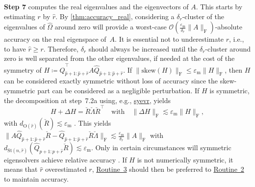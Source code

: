 \documentclass[10pt,twoside,dvipsnames]{siamart1116}
\numberwithin{algorithm}{section}
\numberwithin{equation}{section}
\newcommand{\wordref}[2]{\hyperlink{#1}{#2}}
\begin{document}
	\textbf{Step 7} computes the real eigenvalues and the eigenvectors of $A$. This starts by estimating $r$ by $\widehat{r}$.  By \cref{thm:accuracy_real}, considering a $\delta_r$-cluster of the eigenvalues of $\widehat{\Omega}$ around zero will provide a worst-case $\mathcal{O}(\frac{\varepsilon_\mathrm{m}}{\delta_r}\|A\|_\mathrm{F})$-absolute accuracy on the real eigenspace of~$A$. It is essential not to underestimate $r$, i.e., to have $\widehat{r}\geq r$. Therefore, $\delta_r$ should always be increased until the $\delta_r$-cluster around zero is well separated from the other eigenvalues, if needed at the cost of the symmetry of $H\coloneq \widehat{Q}_{\widehat{p}+1:\widehat{p}+\widehat{r}}^\top A\widehat{Q}_{\widehat{p}+1:\widehat{p}+\widehat{r}}$. If $\|\mathrm{skew}(H)\|_\mathrm{F}\leq \varepsilon_\mathrm{m} \|H\|_\mathrm{F}$, then $H$ can be considered exactly symmetric without loss of accuracy since the skew-symmetric part can be considered as a negligible perturbation. If $H$ is symmetric, the decomposition at step~7.2a using, e.g.,  \href{https://www.netlib.org/lapack/explore-html/d1/d56/group__heevr_gaa334ac0c11113576db0fc37b7565e8b5.html#gaa334ac0c11113576db0fc37b7565e8b5}{syevr}, yields
	\begin{equation*}
		 H + \Delta H = \breve{R}\breve{\Lambda}\breve{R}^\top\quad\text{with}\quad \|\Delta H\|_\mathrm{F}\lesssim \varepsilon_\mathrm{m}\|H\|_\mathrm{F},
	\end{equation*}
	  with $d_{\mathrm{O}(\widehat{r})}(\breve{R})\lesssim \varepsilon_\mathrm{m}$ \cite{lapack99}. This yields $\|A\widehat{Q}_{\widehat{p}+1:\widehat{p}+\widehat{r}} \breve{R} - \widehat{Q}_{\widehat{p}+1:\widehat{p}+\widehat{r}} \breve{R}\breve{\Lambda}\|_\mathrm{F}\lesssim \frac{\varepsilon_\mathrm{m}}{\delta_r} \|A\|_\mathrm{F}$ with $d_{\mathrm{St}(n,\widehat{r})}(\widehat{Q}_{p+1:p+\widehat{r}}\breve{R})\lesssim \varepsilon_\mathrm{m} $. Only in certain circumstances will symmetric eigensolvers achieve relative accuracy \cite{DemmelVeseli92,dhillon1997new,EisenstatIpsen98,VESELIC199381}. %
If $H$ is not numerically symmetric, it means that $\widehat{r}$ overestimated $r$, \wordref{oracle3}{Routine~3} should then be preferred to \wordref{oracle2}{Routine~2} to maintain accuracy.
	
\end{document}
